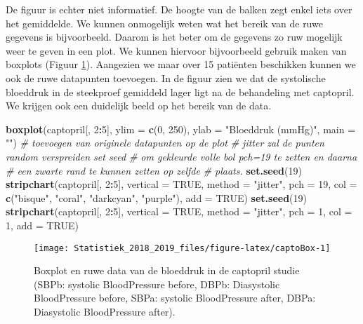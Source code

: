 \documentclass[12pt,dutch,coursenotes]{book}
\newenvironment{Shaded}{\begin{snugshade}}{\end{snugshade}}
\newcommand{\KeywordTok}[1]{\textcolor[rgb]{0.13,0.29,0.53}{\textbf{#1}}}
\newcommand{\DataTypeTok}[1]{\textcolor[rgb]{0.13,0.29,0.53}{#1}}
\newcommand{\DecValTok}[1]{\textcolor[rgb]{0.00,0.00,0.81}{#1}}
\newcommand{\StringTok}[1]{\textcolor[rgb]{0.31,0.60,0.02}{#1}}
\newcommand{\CommentTok}[1]{\textcolor[rgb]{0.56,0.35,0.01}{\textit{#1}}}
\newcommand{\OtherTok}[1]{\textcolor[rgb]{0.56,0.35,0.01}{#1}}
\newcommand{\OperatorTok}[1]{\textcolor[rgb]{0.81,0.36,0.00}{\textbf{#1}}}
\newcommand{\NormalTok}[1]{#1}
\theoremstyle{definition}
\theoremstyle{definition}
\theoremstyle{definition}
\theoremstyle{remark}
\begin{document}
De figuur is echter niet informatief. De hoogte van de balken zegt enkel
iets over het gemiddelde. We kunnen onmogelijk weten wat het bereik van
de ruwe gegevens is bijvoorbeeld. Daarom is het beter om de gegevens zo
ruw mogelijk weer te geven in een plot. We kunnen hiervoor bijvoorbeeld
gebruik maken van boxplots (Figuur \ref{fig:captoBox}). Aangezien we
maar over 15 patiënten beschikken kunnen we ook de ruwe datapunten
toevoegen. In de figuur zien we dat de systolische bloeddruk in de
steekproef gemiddeld lager ligt na de behandeling met captopril. We
krijgen ook een duidelijk beeld op het bereik van de data.

\begin{Shaded}
\begin{Highlighting}[]
\KeywordTok{boxplot}\NormalTok{(captopril[, }\DecValTok{2}\OperatorTok{:}\DecValTok{5}\NormalTok{], }\DataTypeTok{ylim =} \KeywordTok{c}\NormalTok{(}\DecValTok{0}\NormalTok{, }\DecValTok{250}\NormalTok{), }\DataTypeTok{ylab =} \StringTok{"Bloeddruk (mmHg)"}\NormalTok{, }
    \DataTypeTok{main =} \StringTok{""}\NormalTok{)}
\CommentTok{# toevoegen van originele datapunten op de plot}
\CommentTok{# jitter zal de punten random verspreiden set seed}
\CommentTok{# om gekleurde volle bol pch=19 te zetten en daarna}
\CommentTok{# een zwarte rand te kunnen zetten op zelfde}
\CommentTok{# plaats.}
\KeywordTok{set.seed}\NormalTok{(}\DecValTok{19}\NormalTok{)}
\KeywordTok{stripchart}\NormalTok{(captopril[, }\DecValTok{2}\OperatorTok{:}\DecValTok{5}\NormalTok{], }\DataTypeTok{vertical =} \OtherTok{TRUE}\NormalTok{, }\DataTypeTok{method =} \StringTok{"jitter"}\NormalTok{, }
    \DataTypeTok{pch =} \DecValTok{19}\NormalTok{, }\DataTypeTok{col =} \KeywordTok{c}\NormalTok{(}\StringTok{"bisque"}\NormalTok{, }\StringTok{"coral"}\NormalTok{, }\StringTok{"darkcyan"}\NormalTok{, }
        \StringTok{"purple"}\NormalTok{), }\DataTypeTok{add =} \OtherTok{TRUE}\NormalTok{)}
\KeywordTok{set.seed}\NormalTok{(}\DecValTok{19}\NormalTok{)}
\KeywordTok{stripchart}\NormalTok{(captopril[, }\DecValTok{2}\OperatorTok{:}\DecValTok{5}\NormalTok{], }\DataTypeTok{vertical =} \OtherTok{TRUE}\NormalTok{, }\DataTypeTok{method =} \StringTok{"jitter"}\NormalTok{, }
    \DataTypeTok{pch =} \DecValTok{1}\NormalTok{, }\DataTypeTok{col =} \DecValTok{1}\NormalTok{, }\DataTypeTok{add =} \OtherTok{TRUE}\NormalTok{)}
\end{Highlighting}
\end{Shaded}

\begin{figure}

{\centering \texttt{[image: Statistiek\_2018\_2019\_files/figure-latex/captoBox-1]} 

}

\caption{Boxplot en ruwe data van de bloeddruk in de captopril studie (SBPb: systolic BloodPressure before, DBPb: Diasystolic BloodPressure before, SBPa: systolic BloodPressure after, DBPa: Diasystolic BloodPressure after).}\label{fig:captoBox}
\end{figure}
\end{document}
